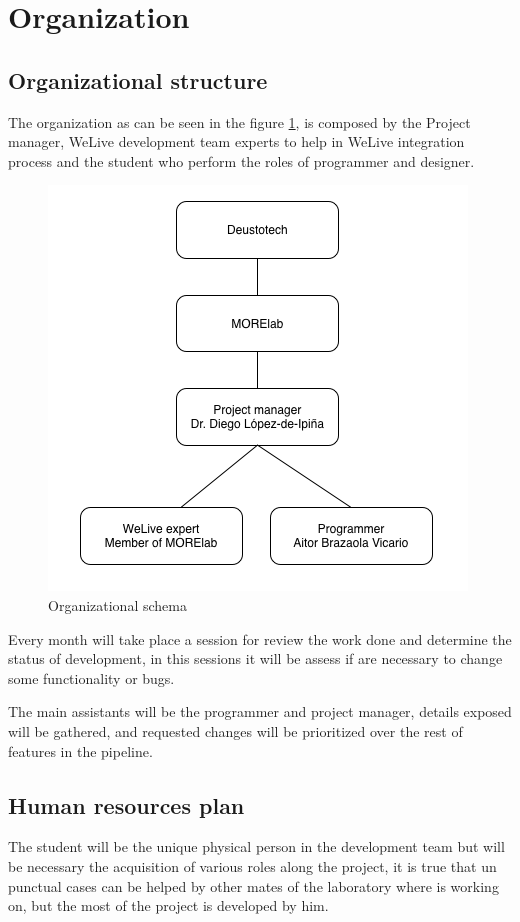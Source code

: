 \documentclass{DeustoFDP}
\begin{document}
\section{Organization}
\subsection{Organizational structure}
The organization as can be seen in the figure \ref{fig:esquemaorganizacion}, is composed by the Project manager, WeLive development team experts to help in WeLive integration process and the student who perform the roles of programmer and designer.

\begin{figure}[h]
	\centering
	\includegraphics[width=0.7\linewidth]{fig/esquemaorganizacion}
	\caption[Organizational schema]{Organizational schema}
	\label{fig:esquemaorganizacion}
\end{figure}

Every month will take place a session for review the work done and determine the status of development, in this sessions it will be assess if are necessary to change some functionality or bugs.

The main assistants will be the programmer and project manager, details exposed will be gathered, and requested changes will be prioritized over the rest of features in the pipeline.

\subsection{Human resources plan}
The student will be the unique physical person in the development team but will be necessary the acquisition of various roles along the project, it is true that un punctual cases can be helped by other mates of the laboratory where is working on, but the most of the project is developed by him.
\end{document}
